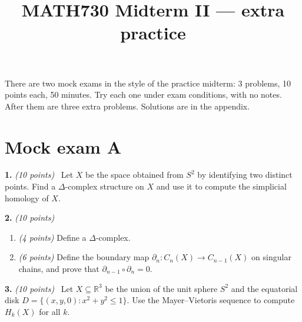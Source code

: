 \documentclass[11pt]{article}
\title{MATH730 Midterm II --- extra practice}
\date{}
\newcommand{\R}{\mathbb R}
\newcommand{\prob}[2]{\par\medskip\textbf{#1.} \textit{(#2 points)}\ }
\begin{document}
\maketitle
\vspace{-2.5em}

There are two mock exams in the style of the practice midterm: 3 problems, 10 points each, 50 minutes. Try each one under exam conditions, with no notes. After them are three extra problems. Solutions are in the appendix.

\section*{Mock exam A}
\begin{exambox}
\prob{1}{10} Let $X$ be the space obtained from $S^2$ by identifying two distinct points. Find a $\Delta$-complex structure on $X$ and use it to compute the simplicial homology of $X$.

\prob{2}{10}
\begin{enumerate}[label=(\alph*),leftmargin=*]
\item \textit{(4 points)} Define a $\Delta$-complex.
\item \textit{(6 points)} Define the boundary map $\partial_n:C_n(X)\to C_{n-1}(X)$ on singular chains, and prove that $\partial_{n-1}\circ\partial_n=0$.
\end{enumerate}

\prob{3}{10} Let $X\subseteq\R^3$ be the union of the unit sphere $S^2$ and the equatorial disk $D=\{(x,y,0):x^2+y^2\le1\}$. Use the Mayer--Vietoris sequence to compute $H_k(X)$ for all $k$.
\end{exambox}

\end{document}
